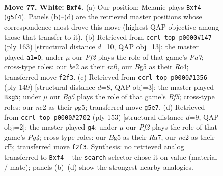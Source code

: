 \documentclass[11pt]{article}
\begin{document}
\clearpage

\begin{figure}[p]\centering
\begin{subfigure}{0.46\textwidth}\centering
\resizebox{\linewidth}{!}{%
\newchessgame
\chessboard[
  setfen={8/6k1/8/6B1/5r2/7K/2n1bP2/8 w - - 0 77},
  showmover=false,
  pgfstyle=straightmove, color=movearrow, markmove={g5-f4}
]}
\caption{}
\end{subfigure}\hfill
\begin{subfigure}{0.46\textwidth}\centering
\resizebox{\linewidth}{!}{%
\newchessgame
\chessboard[
  setfen={8/3k4/R7/8/2rB2P1/8/p2K4/8 b - - 0 82},
  showmover=false,
  pgfstyle=straightmove, color=movearrow, markmove={a2-a1}
]}
\caption{}
\end{subfigure}
\\[4pt]
\begin{subfigure}{0.46\textwidth}\centering
\resizebox{\linewidth}{!}{%
\newchessgame
\chessboard[
  setfen={8/4k3/2R3p1/6P1/5b2/3K4/8/8 b - - 18 75},
  showmover=false,
  pgfstyle=straightmove, color=movearrow, markmove={f4-g5}
]}
\caption{}
\end{subfigure}\hfill
\begin{subfigure}{0.46\textwidth}\centering
\resizebox{\linewidth}{!}{%
\newchessgame
\chessboard[
  setfen={8/r7/2K5/5RpB/8/7k/8/8 b - - 9 77},
  showmover=false,
  pgfstyle=straightmove, color=movearrow, markmove={g5-g4}
]}
\caption{}
\end{subfigure}
\caption{\textbf{Move 77, White: \texttt{Bxf4}.} (a) Our position; Melanie plays \texttt{Bxf4} (\texttt{g5f4}). Panels (b)--(d) are the retrieved master positions whose correspondence most drove this move (highest QAP objective among those that transfer to it). (b) Retrieved from \texttt{ccrl\_top\_p0000\#147} (ply 163) [structural distance $d$=10, QAP obj=13]: the master played \texttt{a1=Q}; under $\mu$ our \emph{Pf2} plays the role of that game's \emph{Pa7}; cross-type roles: our \emph{b}e2 as their \emph{r}a6, our \emph{B}g5 as their \emph{R}c4; transferred move \texttt{f2f3}. (c) Retrieved from \texttt{ccrl\_top\_p0000\#1356} (ply 149) [structural distance $d$=8, QAP obj=3]: the master played \texttt{Bxg5}; under $\mu$ our \emph{Bg5} plays the role of that game's \emph{Bf5}; cross-type roles: our \emph{n}c2 as their \emph{p}g5; transferred move \texttt{g5e7}. (d) Retrieved from \texttt{ccrl\_top\_p0000\#2702} (ply 153) [structural distance $d$=9, QAP obj=2]: the master played \texttt{g4}; under $\mu$ our \emph{Pf2} plays the role of that game's \emph{Pg4}; cross-type roles: our \emph{B}g5 as their \emph{R}a7, our \emph{n}c2 as their \emph{r}f5; transferred move \texttt{f2f3}. Synthesis: no retrieved analog transferred to \texttt{Bxf4} -- the \texttt{search} selector chose it on value (material / mate); panels (b)--(d) show the strongest nearby analogies.}
\label{fig:thought-m152}
\end{figure}
\end{document}
